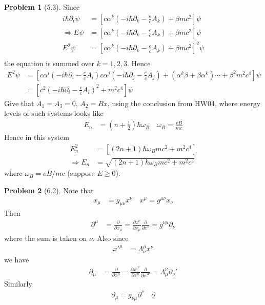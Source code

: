 \documentclass[twoside,11pt]{article}
\newcommand{\lms}{\fontfamily{lmss}\selectfont} %
\theoremstyle{definition}
\newtheorem{problem}{Problem}
\theoremstyle{remark}
\begin{document}
\begin{problem}[5.3]
Since
\begin{align*}
    i\hbar\partial_t\psi &= 
    \left[c\alpha^k\left(-i\hbar \partial_k - \frac{e}{c}A_k\right)+ \beta mc^2\right]\psi\\
    \Rightarrow
    E\psi &= 
    \left[c\alpha^k\left(-i\hbar \partial_k - \frac{e}{c}A_k\right)+ \beta mc^2\right]\psi\\
    E^2\psi &= 
    \left[c\alpha^k\left(-i\hbar \partial_k - \frac{e}{c}A_k\right)+ \beta mc^2\right]^2\psi\\
\end{align*}
the equation is summed over $k=1,2,3$.
Hence
\begin{align*}
    E^2\psi &= 
    \left[
    c\alpha^i\left(-i\hbar \partial_i - \frac{e}{c}A_i\right)
    c\alpha^j\left(-i\hbar \partial_j - \frac{e}{c}A_j\right)
    + (\alpha^k\beta + \beta\alpha^k)\cdots
    + \beta^2 m^2c^4
    \right]\psi\\
    &= \left[
    c^2\left(-i\hbar \partial_i - \frac{e}{c}A_i\right)^2
    + m^2c^4
    \right]\psi
\end{align*}
Give that $A_1=A_3=0$, $A_2=Bx$, 
using the conclusion from {\lms HW04}, where energy levels of such systems looks like
\begin{align*}
    E_n &= \left(n + \frac{1}{2}\right)\hbar\omega_B\quad
    \omega_B = \frac{eB}{mc}
\end{align*}
Hence in this system
\begin{align*}
    E_n^2 &= \left[
    (2n+1)\hbar\omega_B mc^2 + m^2c^4
    \right]\\
    \Rightarrow E_n &= 
    \sqrt{(2n+1)\hbar\omega_B mc^2 + m^2c^4}
\end{align*}
where $\omega_B = eB/mc$ (suppose $E\geq 0$).

\end{problem}


\begin{problem}[6.2]
Note that
\begin{align*}
    x_\mu &= g_{\mu\nu}x^\nu\quad
    x^\mu = g^{\mu\nu}x_\nu
\end{align*}
Then
\begin{align*}
    \partial^\mu &=
    \frac{\partial}{\partial x_\mu}
    = \frac{\partial x^\nu}{\partial x_\mu}\frac{\partial}{\partial x^\nu}
    = g^{\nu\mu} \partial_\nu
\end{align*}
where the sum is taken on $\nu$.
Also since
\begin{align*}
    {x'}^\mu &= \Lambda^\mu_\nu x^\nu
\end{align*}
we have
\begin{align*}
    \partial_\mu &= 
    \frac{\partial}{\partial x^\mu}
    = \frac{\partial {x'}^\nu}{\partial x^\mu}\frac{\partial}{\partial {x'}^\nu}
    = \Lambda^\nu_\mu\partial_\nu'
\end{align*}
Similarly
\begin{align*}
    \partial_\mu = g_{\nu\mu}\partial^\nu\quad
    \partial
\end{align*}

\end{problem}
\end{document}
